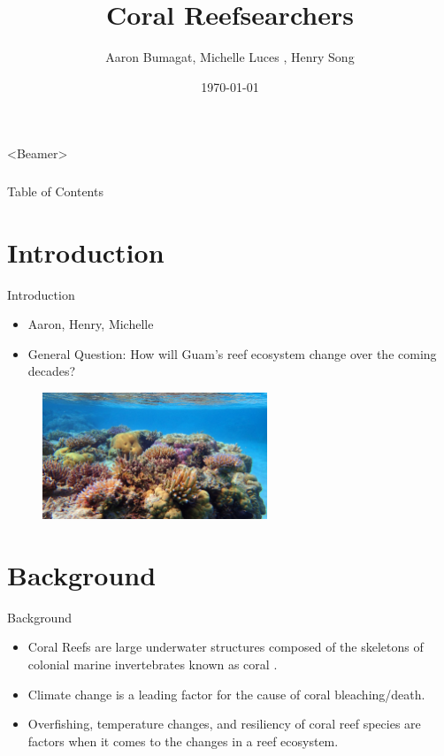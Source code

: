 \documentclass{beamer}
\title[]{Coral Reefsearchers}
\author{Aaron Bumagat\inst{1}, Michelle Luces \inst{1}, Henry Song \inst{1} }
\institute{University of Guam}
\date{\today}
\begin{document}
\frame{\titlepage}

\AtBeginSection[]{}
\begin{frame}<Beamer>
\frametitle{}
\setcounter{tocdepth}{2}
\setcounter{tocdepth}{1}
\end{frame}

\begin{frame}{Table of Contents}
\tableofcontents
\end{frame}

\section{Introduction}
\begin{frame}{Introduction}
\begin{itemize}
    \item Aaron, Henry, Michelle
    \item General Question: How will Guam's reef ecosystem change over the coming decades?
\end{itemize}
\begin{figure}
    \centering
    \includegraphics[width=0.6\textwidth]{Figures/coral_picture.jpg}
\end{figure}
\end{frame}

\section{Background}
\begin{frame}{Background}
    \begin{itemize}
        \item Coral Reefs are large underwater structures composed of the skeletons of colonial marine invertebrates known as coral \cite{ross}.
        \item Climate change is a leading factor for the cause of coral bleaching/death.
        \item Overfishing, temperature changes, and resiliency of coral reef species are factors when it comes to the changes in a reef ecosystem.
    \end{itemize}
\end{frame}
\end{document}
